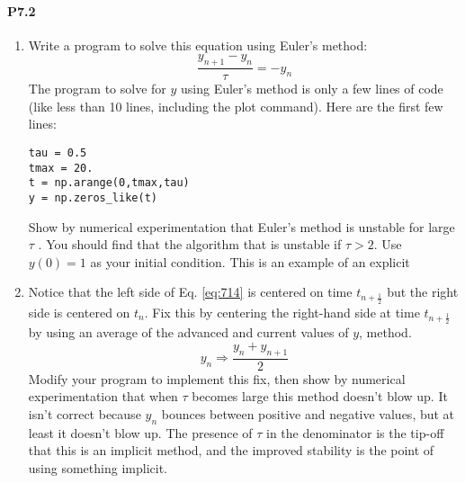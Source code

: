 \paragraph*{P7.2}
\begin{enumerate}[label=(\alph*)]
\item Write a program to solve this equation using Euler\rq s method:
\begin{equation}\label{eq:714}
\frac{y_{n+1}-y_n}{\tau} = -y_n
\end{equation}
The program to solve for $y$ using Euler\rq s method is only a few lines of
code (like less than 10 lines, including the plot command). Here are
the first few lines:
\begin{lstlisting}
tau = 0.5
tmax = 20.
t = np.arange(0,tmax,tau)
y = np.zeros_like(t)
\end{lstlisting}
Show by numerical experimentation that Euler\rq s method is unstable
for large $\tau$ . You should find that the algorithm that is unstable if $\tau > 2$.
Use $y(0) = 1$ as your initial condition. This is an example of an explicit
\item Notice that the left side of Eq. \eqref{eq:714} is centered on time $t_{n+\frac{1}{2}}$ but the
right side is centered on $t_n$. Fix this by centering the right-hand side at time $t_{n+\frac{1}{2}}$ by using an average of the advanced and current values of $y$, method.
\begin{equation*}
y_{n} \Rightarrow \frac{y_{n}+y_{n+1}}{2}
\end{equation*}
Modify your program to implement this fix, then show by numerical
experimentation that when $\tau$ becomes large this method doesn\rq t blow
up. It isn\rq t correct because $y_n$ bounces between positive and negative
values, but at least it doesn\rq t blow up. The presence of $\tau$ in the denominator is the tip-off that this is an implicit method, and the improved
stability is the point of using something implicit.


\end{enumerate}
